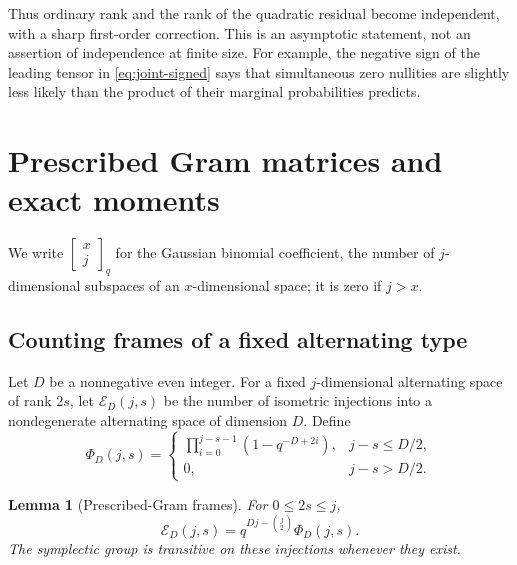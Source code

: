 \documentclass[11pt]{article}
\newtheorem{lemma}[theorem]{Lemma}
\theoremstyle{definition}
\theoremstyle{remark}
\newcommand{\Emb}{\mathcal E}
\newcommand{\gb}[2]{\begin{bmatrix}#1\\#2\end{bmatrix}_{q}}
\begin{document}
Thus ordinary rank and the rank of the quadratic residual become independent, with a sharp first-order correction. This is an asymptotic statement, not an assertion of independence at finite size. For example, the negative sign of the leading tensor in \eqref{eq:joint-signed} says that simultaneous zero nullities are slightly less likely than the product of their marginal probabilities predicts.

\section{Prescribed Gram matrices and exact moments}\label{sec:counts}

We write $\gb{x}{j}$ for the Gaussian binomial coefficient, the number of $j$-dimensional subspaces of an $x$-dimensional space; it is zero if $j>x$.

\subsection{Counting frames of a fixed alternating type}

Let $D$ be a nonnegative even integer. For a fixed $j$-dimensional alternating space of rank $2s$, let $\Emb_D(j,s)$ be the number of isometric injections into a nondegenerate alternating space of dimension $D$. Define
\begin{equation}\label{eq:Phi}
 \Phi_D(j,s)=
 \begin{cases}
  \displaystyle\prod_{i=0}^{j-s-1}(1-q^{-D+2i}),&j-s\le D/2,\\
  0,&j-s>D/2.
 \end{cases}
\end{equation}

\begin{lemma}[Prescribed-Gram frames]\label{lem:frames}
For $0\le2s\le j$,
\begin{equation}\label{eq:embedding}
 \Emb_D(j,s)=q^{Dj-\binom j2}\Phi_D(j,s).
\end{equation}
The symplectic group is transitive on these injections whenever they exist.
\end{lemma}
\end{document}
